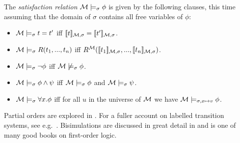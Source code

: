 \begin{definition}
\begin{itemize}
\end{itemize}

\NI The \emph{satisfaction relation} $\mathcal{M} \models_{\sigma} \phi$
is given by the following clauses, this time assuming that the domain
of $\sigma$ contains all free variables of $\phi$:
\begin{itemize}

\item $\mathcal{M} \models_{\sigma} t = t'$ iff $\lbrack\!\lbrack t \rbrack\!\rbrack_{\mathcal{M}, \sigma} = \lbrack\!\lbrack t' \rbrack\!\rbrack_{\mathcal{M}, \sigma}$.
\item $\mathcal{M} \models_{\sigma} R(t_1, ..., t_n)$ iff
  $R^{\mathcal{M}}(\lbrack\!\lbrack t_1 \rbrack\!\rbrack_{\mathcal{M}, \sigma}, ..., \lbrack\!\lbrack t_n \rbrack\!\rbrack_{\mathcal{M},
  \sigma})$.
\item $\mathcal{M} \models_{\sigma} \neg \phi$ iff $\mathcal{M} \not\models_{\sigma} \phi$.
\item $\mathcal{M} \models_{\sigma} \phi \land \psi$ iff $\mathcal{M} \models_{\sigma} \phi$ and $\mathcal{M} \models_{\sigma} \psi$.
\item $\mathcal{M} \models_{\sigma} \forall x.\phi$ iff for all $u$ in the
  universe of $\mathcal{M}$ we have $\mathcal{M} \models_{\sigma, x \mapsto v} \phi$.

\end{itemize}

\end{definition}

\NI Partial orders are explored in \cite{DaveyBA:intlatao}. For a
fuller account on labelled transition systems, see
e.g.~\cite{SassoneV:modcontac,HennessyM:Algtheop}. Bisimulations are
discussed in great detail in \cite{SangiorgiD:intbisac} and
\cite{EndertonHB:matinttl} is one of many good books on first-order
logic.

